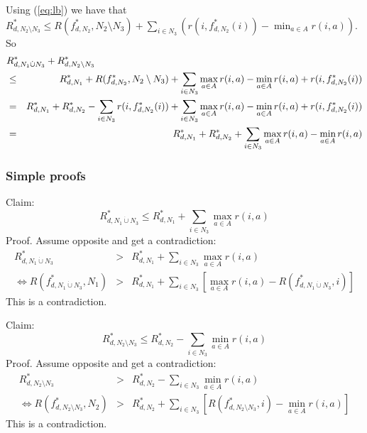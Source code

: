 \documentclass{article}
\begin{document}
Using (\ref{eq:lb}) we have that $R^{*}_{d,N_{2}\setminus N_{3}} \leq
R(f^{*}_{d,N_{2}},N_{2}\setminus N_{3}) + \sum_{i \in
  N_{3}}(r(i,f^{*}_{d,N_{2}}(i)) - \min_{a \in A} r(i,a) )$. So
\begin{eqnarray}
  \label{eq:splitub}
  \lefteqn{
  R^{*}_{d,N_{1}\dot\cup N_{3}} +
  R^{*}_{d,N_{2}\setminus N_{3}}}&& \nonumber \\
& \leq & R^{*}_{d,N_{1}} + 
R(f^{*}_{d,N_{2}},N_{2}\setminus N_{3}) + \sum_{i \in
  N_{3}} \max_{a \in A} r(i,a)   - \min_{a \in A} r(i,a) +
r(i,f^{*}_{d,N_{2}}(i)) \nonumber \\
& = & R^{*}_{d,N_{1}} + R^{*}_{d,N_{2}}  - \sum_{i \in
  N_{3}} r(i,f^{*}_{d,N_{2}}(i))  + \sum_{i \in
  N_{3}} \max_{a \in A} r(i,a)   - \min_{a \in A} r(i,a) +
r(i,f^{*}_{d,N_{2}}(i)) \nonumber \\
& = &  R^{*}_{d,N_{1}} + R^{*}_{d,N_{2}} + \sum_{i \in
  N_{3}} \max_{a \in A} r(i,a)   - \min_{a \in A} r(i,a) \nonumber \\
\end{eqnarray}

\subsubsection{Simple proofs}
\label{sec:simple}

Claim:
\begin{equation}
  \label{eq:simpleleft}
  R^{*}_{d,N_{1}\dot\cup N_{3}}  \leq R^{*}_{d,N_{1}} +    \sum_{i \in
  N_{3}} \max_{a \in A} r(i,a)
\end{equation}
Proof. Assume opposite and get a contradiction:
\begin{eqnarray*}
  R^{*}_{d,N_{1}\dot\cup N_{3}} & > &R^{*}_{d,N_{1}} +    \sum_{i \in
    N_{3}} \max_{a \in A} r(i,a)\\
\Leftrightarrow  R(f^{*}_{d,N_{1}\dot\cup N_{3}},N_{1}) & > & R^{*}_{d,N_{1}} +    \sum_{i \in
    N_{3}} \left[ \max_{a \in A} r(i,a) - R(f^{*}_{d,N_{1}\dot\cup N_{3}},i)\right]
\end{eqnarray*}
This is a contradiction.

Claim:
\begin{equation}
  \label{eq:simpleright}
    R^{*}_{d,N_{2}\setminus N_{3}} \leq R^{*}_{d,N_{2}} - \sum_{i \in
    N_{3}} \min_{a \in A} r(i,a)
\end{equation}
Proof. Assume opposite and get a contradiction:
\begin{eqnarray*}
    R^{*}_{d,N_{2}\setminus N_{3}} & > & R^{*}_{d,N_{2}} - \sum_{i \in
    N_{3}} \min_{a \in A} r(i,a) \\
\Leftrightarrow  R(f^{*}_{d,N_{2}\setminus N_{3}},N_{2}) & > & R^{*}_{d,N_{2}} + \sum_{i \in
    N_{3}} \left[  R(f^{*}_{d,N_{2}\setminus N_{3}},i) -  \min_{a \in A} r(i,a)\right]
\end{eqnarray*}
This is a contradiction.
\end{document}

